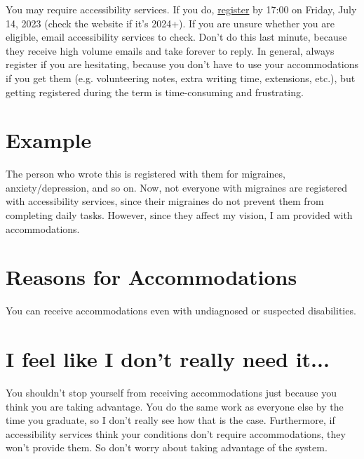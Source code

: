 You may require accessibility services. If you do, \href{https://studentlife.utoronto.ca/service/accessibility-services-registration-and-documentation-requirements/}{register} by 17:00 on Friday, July 14, 2023 (check the website if it's 2024+). If you are unsure whether you are eligible, email accessibility services to check. Don't do this last minute, because they receive high volume emails and take forever to reply. In general, always register if you are hesitating, because you don't have to use your accommodations if you get them (e.g. volunteering notes, extra writing time, extensions, etc.), but getting registered during the term is time-consuming and frustrating.

\section{Example}

The person who wrote this is registered with them for migraines, anxiety/depression, and so on. Now, not everyone with migraines are registered with accessibility services, since their migraines do not prevent them from completing daily tasks. However, since they affect my vision, I am provided with accommodations.

\section{Reasons for Accommodations}

You can receive accommodations even with undiagnosed or suspected disabilities.

\section{I feel like I don't really need it...}

You shouldn't stop yourself from receiving accommodations just because you think you are taking advantage. You do the same work as everyone else by the time you graduate, so I don't really see how that is the case. Furthermore, if accessibility services think your conditions don't require accommodations, they won't provide them. So don't worry about taking advantage of the system.
